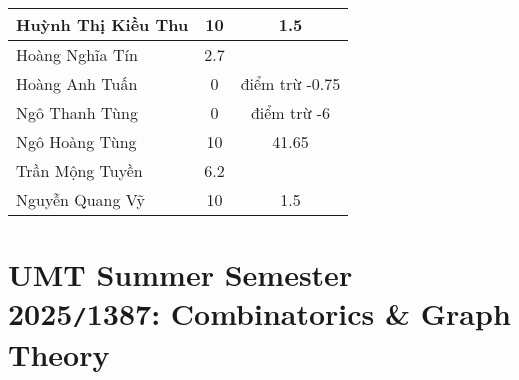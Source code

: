 \documentclass{article}
\begin{document}
\begin{table}[H]
\begin{tabular}{|l|c|c|}
        \hline
        Huỳnh Thị Kiều Thu & 10 & 1.5 \\
        \hline
        Hoàng Nghĩa Tín & 2.7 &  \\
        \hline
        Hoàng Anh Tuấn & 0 & điểm trừ -0.75 \\
        \hline
        Ngô Thanh Tùng & 0 & điểm trừ -6 \\
        \hline
        Ngô Hoàng Tùng & 10 & 41.65 \\
        \hline
        Trần Mộng Tuyền & 6.2 &  \\
        \hline
        Nguyễn Quang Vỹ & 10 & 1.5 \\
        \hline
    \end{tabular}
\end{table}


\section{UMT Summer Semester 2025{\tt/}1387: Combinatorics \& Graph Theory}
\end{document}
